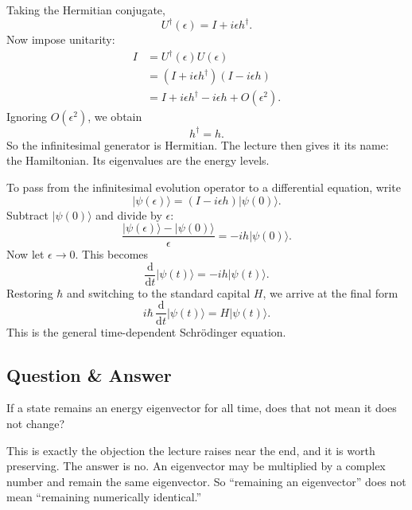 Taking the Hermitian conjugate,
\begin{equation}
U^\dagger(\epsilon)=I+i\epsilon h^\dagger.
\end{equation}
Now impose unitarity:
\begin{align}
I
&= U^\dagger(\epsilon)U(\epsilon) \\
&= (I+i\epsilon h^\dagger)(I-i\epsilon h) \\
&= I + i\epsilon h^\dagger - i\epsilon h + O(\epsilon^2).
\end{align}
Ignoring \(O(\epsilon^2)\), we obtain
\begin{equation}
h^\dagger = h.
\end{equation}
So the infinitesimal generator is Hermitian. The lecture then gives it its name: the Hamiltonian. Its eigenvalues are the energy levels.

To pass from the infinitesimal evolution operator to a differential equation, write
\begin{equation}
|\psi(\epsilon)\rangle = (I-i\epsilon h)|\psi(0)\rangle.
\end{equation}
Subtract \(|\psi(0)\rangle\) and divide by \(\epsilon\):
\begin{equation}
\frac{|\psi(\epsilon)\rangle-|\psi(0)\rangle}{\epsilon}
=
-i h |\psi(0)\rangle.
\end{equation}
Now let \(\epsilon\to 0\). This becomes
\begin{equation}
\frac{\mathrm{d}}{\mathrm{d}t}|\psi(t)\rangle = -i h |\psi(t)\rangle.
\end{equation}
Restoring \(\hbar\) and switching to the standard capital \(H\), we arrive at the final form
\begin{equation}
i\hbar\,\frac{\mathrm{d}}{\mathrm{d}t}|\psi(t)\rangle = H|\psi(t)\rangle.
\end{equation}
This is the general time-dependent Schr\"odinger equation.

\subsection{Question \& Answer}

If a state remains an energy eigenvector for all time, does that not mean it does not change?

This is exactly the objection the lecture raises near the end, and it is worth preserving. The answer is no. An eigenvector may be multiplied by a complex number and remain the same eigenvector. So ``remaining an eigenvector'' does not mean ``remaining numerically identical.''

